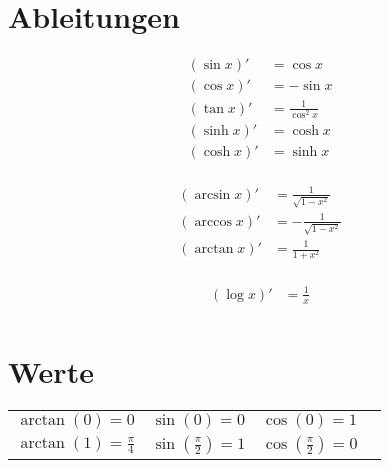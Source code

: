\documentclass[a4paper,10pt]{article}
\DeclareMathOperator{\arcsinh}{arcsinh}
\DeclareMathOperator{\arccosh}{arccosh}
\DeclareMathOperator{\arctanh}{arctanh}
\begin{document}
\section{Ableitungen}
\begin{table}[ht]
\begin{minipage}[b]{0.3\linewidth}\centering
\begin{align*}
    (\sin x)'    &= \cos x \\
    (\cos x)'    &= -\sin x \\
    (\tan x)'    &= \frac{1}{\cos^2 x} \\
    (\sinh x)'   &= \cosh x \\
    (\cosh x)'   &= \sinh x \\
\end{align*}

\end{minipage}
\hspace{0.1cm}
\begin{minipage}[b]{0.3\linewidth}
\centering

\begin{align*}
    (\arcsin x)'  &=   \frac {1}{\sqrt{1-x^2}} \\
    (\arccos x)'  &= - \frac {1}{\sqrt{1-x^2}} \\
    (\arctan x)'  &=   \frac {1}{1 + x^2} \\
\end{align*}
\end{minipage}
\hspace{0.1cm}
\begin{minipage}[b]{0.3\linewidth}
\centering
\begin{align*}
    (\log x)' &= \frac{1}{x} \\
\end{align*}
\end{minipage}
\end{table}

\section{Werte}
\begin{table}[h]
    \centering
    \begin{tabular}{llll}
        \(\arctan(0) = 0\)             & \(\sin(0) = 0\)                & \(\cos(0) = 1\) \\
        \(\arctan(1) = \frac{\pi}{4}\) & \(\sin(\frac{\pi}{2}) = 1\)    & \(\cos(\frac{\pi}{2}) = 0\)\\
    \end{tabular}
\end{table}
\end{document}
